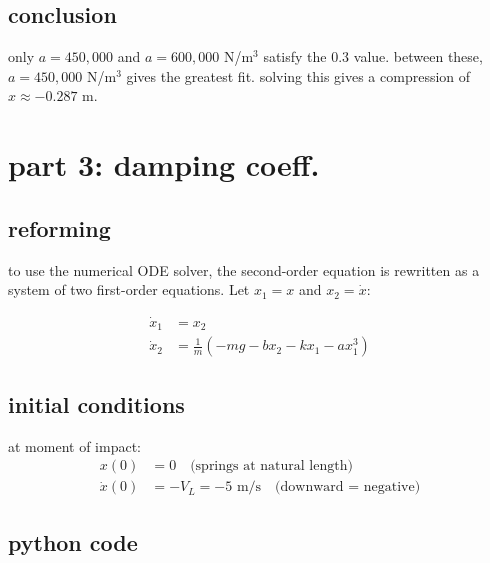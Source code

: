 \documentclass[12pt]{article}
\begin{document}
\subsection{conclusion}

only $a = 450{,}000$ and $a = 600{,}000$ N/m$^3$ satisfy the 0.3 value. between these, $a = 450{,}000$ N/m$^3$ gives the greatest fit. solving this gives a compression of  $x \approx -0.287$ m.

\section{part 3: damping coeff.}


\subsection{reforming}

to use the numerical ODE solver, the second-order equation is rewritten as a system of two first-order equations. Let $x_1 = x$ and $x_2 = \dot{x}$:

\begin{align*}
    \dot{x}_1 &= x_2 \\
    \dot{x}_2 &= \frac{1}{m}\left(-mg - bx_2 - kx_1 - ax_1^3\right)
\end{align*}

\subsection{initial conditions}

at moment of impact:
\begin{align*}
    x(0) &= 0 \quad \text{(springs at natural length)} \\
    \dot{x}(0) &= -V_L = -5 \text{ m/s} \quad \text{(downward = negative)}
\end{align*}

\subsection{python code}
\end{document}

